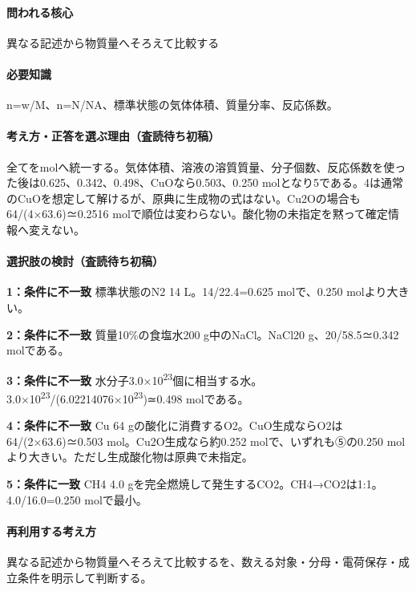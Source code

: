 \paragraph{問われる核心} 異なる記述から物質量へそろえて比較する

\paragraph{必要知識} n=\allowbreak{}w/M、n=\allowbreak{}N/NA、標準状態の気体体積、質量分率、反応係数。

\paragraph{考え方・正答を選ぶ理由（査読待ち初稿）} 全てをmolへ統一する。気体体積、溶液の溶質質量、分子個数、反応係数を使った後は0.625、0.342、0.498、CuOなら0.503、0.250 molとなり5である。4は通常のCuOを想定して解けるが、原典に生成物の式はない。Cu2Oの場合も64/(4×63.6)≃0.2516 molで順位は変わらない。酸化物の未指定を黙って確定情報へ変えない。

\paragraph{選択肢の検討（査読待ち初稿）}\mbox{}\par

\noindent\textbf{1：条件に不一致} 標準状態のN2 14 L。14/22.4=\allowbreak{}0.625 molで、0.250 molより大きい。\par

\noindent\textbf{2：条件に不一致} 質量10\%の食塩水200 g中のNaCl。NaCl20 g、20/58.5≃0.342 molである。\par

\noindent\textbf{3：条件に不一致} 水分子3.0×10\textsuperscript{23}個に相当する水。3.0×10\textsuperscript{23}/(6.02214076×10\textsuperscript{23})≃0.498 molである。\par

\noindent\textbf{4：条件に不一致} Cu 64 gの酸化に消費するO2。CuO生成ならO2は64/(2×63.6)≃0.503 mol。Cu2O生成なら約0.252 molで、いずれも⑤の0.250 molより大きい。ただし生成酸化物は原典で未指定。\par

\noindent\textbf{5：条件に一致} CH4 4.0 gを完全燃焼して発生するCO2。CH4→CO2は1:1。4.0/16.0=\allowbreak{}0.250 molで最小。\par

\paragraph{再利用する考え方} 異なる記述から物質量へそろえて比較するを、数える対象・分母・電荷保存・成立条件を明示して判断する。

